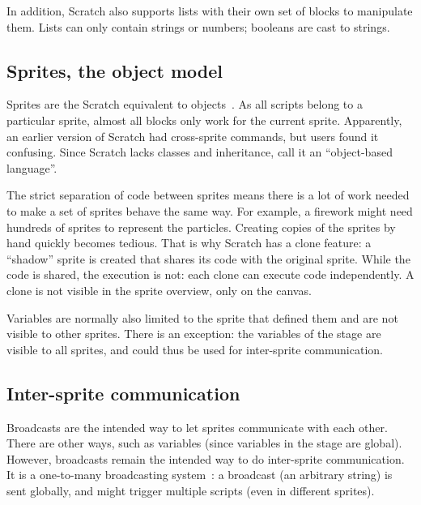 \documentclass[../main]{subfiles}
\begin{document}
In addition, Scratch also supports lists with their own set of blocks to manipulate them.
Lists can only contain strings or numbers; booleans are cast to strings.

\subsection{Sprites, the object model}\label{subsec:sprites-the-object-model}

Sprites are the Scratch equivalent to objects~\autocite{maloneyScratchProgrammingLanguage2010a}.
As all scripts belong to a particular sprite, almost all blocks only work for the current sprite.
Apparently, an earlier version of Scratch had cross-sprite commands, but users found it confusing.
Since Scratch lacks classes and inheritance, \citeauthor{maloneyScratchProgrammingLanguage2010a} call it an ``object-based language''.

The strict separation of code between sprites means there is a lot of work needed to make a set of sprites behave the same way.
For example, a firework might need hundreds of sprites to represent the particles.
Creating copies of the sprites by hand quickly becomes tedious.
That is why Scratch has a clone feature: a ``shadow'' sprite is created that shares its code with the original sprite.
While the code is shared, the execution is not: each clone can execute code independently.
A clone is not visible in the sprite overview, only on the canvas.

Variables are normally also limited to the sprite that defined them and are not visible to other sprites.
There is an exception: the variables of the stage are visible to all sprites, and could thus be used for inter-sprite communication.

\subsection{Inter-sprite communication}\label{subsec:intersprite-communications}

\textcolor{screvent}{Broadcasts} are the intended way to let sprites communicate with each other.
There are other ways, such as variables (since variables in the stage are global).
However, broadcasts remain the intended way to do inter-sprite communication.
It is a one-to-many broadcasting system~\autocite{maloneyScratchProgrammingLanguage2010a}: a broadcast (an arbitrary string) is sent globally, and might trigger multiple scripts (even in different sprites).
\end{document}
